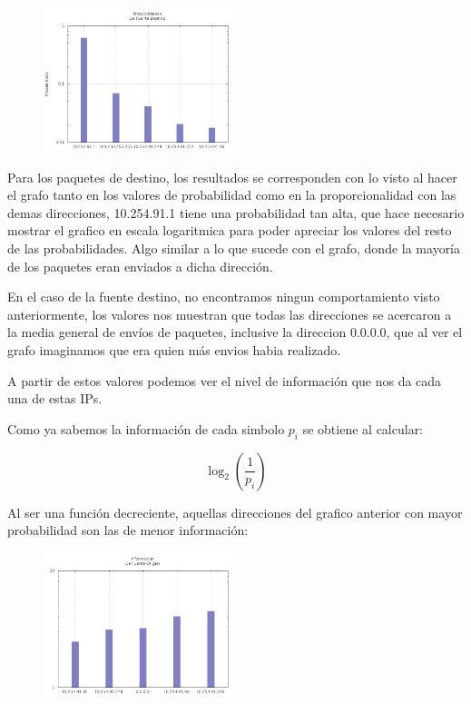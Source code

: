 \begin{figure}[!ht]
    \centering
    \includegraphics[width=0.5\textwidth]{img/graph/escenario_3/proba_dst.png}
\end{figure}


	\par Para los paquetes de destino, los resultados se corresponden con lo visto al hacer el grafo tanto en los valores de probabilidad como en la proporcionalidad con las demas direcciones, 10.254.91.1 tiene una probabilidad tan alta, que hace necesario mostrar el grafico en escala logaritmica para poder apreciar los valores del resto de las probabilidades. Algo similar a lo que sucede con el grafo, donde la mayoría de los paquetes eran enviados a dicha dirección.
	\vspace{6 mm}

	\par En el caso de la fuente destino, no encontramos ningun comportamiento visto anteriormente, los valores nos muestran que todas las direcciones se acercaron a la media general de envíos de paquetes, inclusive la direccion 0.0.0.0, que al ver el grafo imaginamos que era quien más envios habia realizado. 


	\par A partir de estos valores podemos ver el nivel de información que nos da cada una de estas IPs.

	\par Como ya sabemos la información de cada simbolo $p_{i}$ se obtiene al calcular:

\begin{equation}
	\log_2 (\frac{1}{ p_{i} })
\end{equation}

	\par Al ser una función decreciente, aquellas direcciones del grafico anterior con mayor probabilidad son las de menor información:

\begin{figure}[!ht]
    \centering
    \includegraphics[width=0.5\textwidth]{img/graph/escenario_3/info_src.png}
\end{figure}


